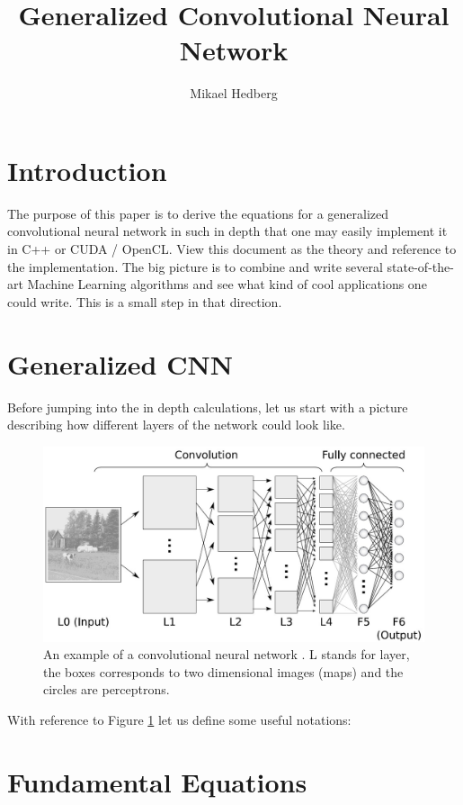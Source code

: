 \documentclass[a4paper,10pt]{article}
\title{Generalized Convolutional Neural Network}
\author{Mikael Hedberg}
\theoremstyle{definition}
\begin{document}
\maketitle

\section{Introduction}
The purpose of this paper is to derive the equations for a generalized convolutional neural network in such in depth that one may easily implement it in C++ or CUDA / OpenCL. View this document as the theory and reference to the implementation. The big picture is to combine and write several state-of-the-art Machine Learning algorithms and see what kind of cool applications one could write. This is a small step in that direction.

\section{Generalized CNN}

Before jumping into the in depth calculations, let us start with a picture describing how different layers of the network could look like.\\

\begin{figure}[h!]
  \centering
    \includegraphics[scale=0.3]{convolutional-neural-network}
      \caption{An example of a convolutional neural network \cite{convNetPicture}. L stands for layer, the boxes corresponds to two dimensional images (maps) and the circles are perceptrons.}
      \label{fig:convNet}
\end{figure}

With reference to Figure \ref{fig:convNet} let us define some useful notations:\\

\section{Fundamental Equations}
\end{document}
